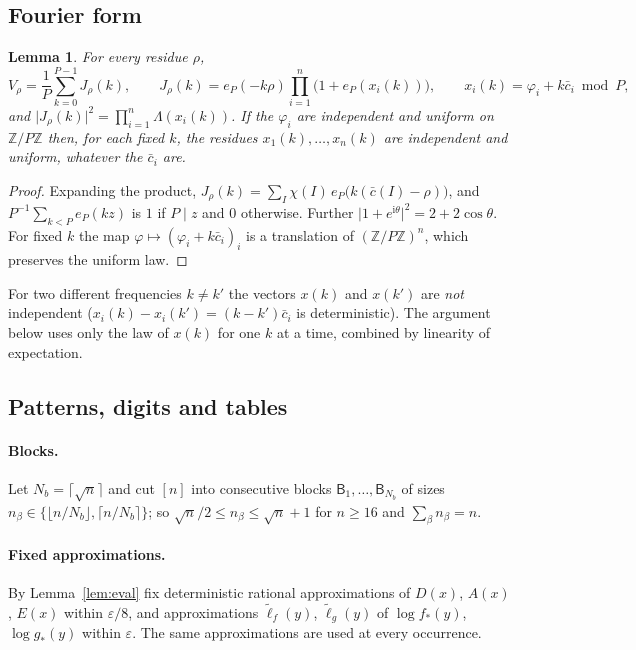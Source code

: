 \documentclass[11pt]{article}
\newtheorem{lemma}{Lemma}[section]
\theoremstyle{definition}
\newcommand{\Z}{\mathbb Z}
\newcommand{\eps}{\varepsilon}
\newcommand{\bc}{\bar c}
\newcommand{\abs}[1]{\lvert #1\rvert}
\newcommand{\floor}[1]{\lfloor #1\rfloor}
\newcommand{\ceil}[1]{\lceil #1\rceil}
\begin{document}
\subsection{Fourier form}
\begin{lemma}\label{lem:fourier}
For every residue $\rho$,
\begin{equation}\label{eq:fourier}
 V_\rho=\frac1P\sum_{k=0}^{P-1}J_\rho(k),\qquad J_\rho(k)=e_P(-k\rho)\prod_{i=1}^n\bigl(1+e_P(x_i(k))\bigr),\qquad
 x_i(k)=\varphi_i+k\bc_i\bmod P,
\end{equation}
and $\abs{J_\rho(k)}^2=\prod_{i=1}^n\Lambda(x_i(k))$. If the $\varphi_i$ are independent and uniform on $\Z/P\Z$ then, for
each fixed $k$, the residues $x_1(k),\dots,x_n(k)$ are independent and uniform, whatever the $\bc_i$ are.
\end{lemma}
\begin{proof}
Expanding the product, $J_\rho(k)=\sum_{I}\chi(I)\,e_P\bigl(k(\bc(I)-\rho)\bigr)$, and
$P^{-1}\sum_{k<P}e_P(kz)$ is $1$ if $P\mid z$ and $0$ otherwise. Further $\abs{1+e^{\mathrm i\theta}}^2=2+2\cos\theta$.
For fixed $k$ the map $\varphi\mapsto(\varphi_i+k\bc_i)_i$ is a translation of $(\Z/P\Z)^n$, which preserves the uniform
law.
\end{proof}
For two different frequencies $k\ne k'$ the vectors $x(k)$ and $x(k')$ are \emph{not} independent
($x_i(k)-x_i(k')=(k-k')\bc_i$ is deterministic). The argument below uses only the law of $x(k)$ for one $k$ at a
time, combined by linearity of expectation.

\subsection{Patterns, digits and tables}\label{sec:tables}
\paragraph{Blocks.} Let $N_b=\ceil{\sqrt n}$ and cut $[n]$ into consecutive blocks $\mathsf B_1,\dots,\mathsf B_{N_b}$
of sizes $n_\beta\in\{\floor{n/N_b},\ceil{n/N_b}\}$; so $\sqrt n/2\le n_\beta\le\sqrt n+1$ for $n\ge16$ and
$\sum_\beta n_\beta=n$.

\paragraph{Fixed approximations.} By Lemma~\ref{lem:eval} fix deterministic rational approximations of $D(x)$,
$A(x)$, $E(x)$ within $\eps/8$, and approximations $\tilde\ell_f(y)$, $\tilde\ell_g(y)$ of $\log f_\ast(y)$,
$\log g_\ast(y)$ within $\eps$. The same approximations are used at every occurrence.
\end{document}

